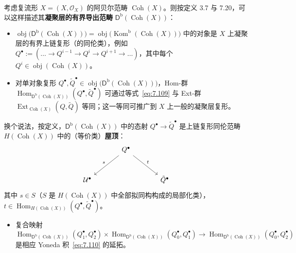 \begin{Def}\label{def:7.22}
考虑复流形 $X=(X,\mathcal O_X)$ 的阿贝尔范畴 $\operatorname{Coh}(X)$。则按定义 3.7 与 7.20，可以这样描述其\textbf{凝聚层的有界导出范畴} $\mathsf D^{\mathrm b}(\operatorname{Coh}(X))$：
\begin{itemize}
  \item $\operatorname{obj}\bigl(\mathsf D^{\mathrm b}(\operatorname{Coh}(X))\bigr)=\operatorname{obj}\bigl(\operatorname{Kom}^{\mathrm b}(\operatorname{Coh}(X))\bigr)$ 中的对象是 $X$ 上凝聚层的有界上链复形（的同伦类），例如 $Q^\bullet:=(\dots\to Q^{i-1}\to Q^i\to Q^{i+1}\to\dots)$，其中每个 $Q^i\in\operatorname{obj}(\operatorname{Coh}(X))$。
  \item 对单对象复形 $Q^\bullet,\tilde Q^\bullet\in\operatorname{obj}\bigl(\mathsf D^{\mathrm b}(\operatorname{Coh}(X))\bigr)$，Hom-群 $\operatorname{Hom}_{\mathsf D^{\mathrm b}(\operatorname{Coh}(X))}(Q^\bullet,\tilde Q^\bullet)$ 可通过等式~\eqref{eq:7.109} 与 Ext-群 $\operatorname{Ext}_{\operatorname{Coh}(X)}(Q,\tilde Q)$ 等同；这一等同可推广到 $X$ 上一般的凝聚层复形。
\end{itemize}
换个说法，按定义，$\mathsf D^{\mathrm b}(\operatorname{Coh}(X))$ 中的态射 $Q^\bullet\to\tilde Q^\bullet$ 是上链复形同伦范畴 $H(\operatorname{Coh}(X))$ 中的（等价类）\textbf{屋顶}：
\begin{equation}\label{eq:7.111}
\begin{tikzcd}[column sep=large, row sep=large]
& Q^\bullet \arrow[dl, "s"'] \arrow[dr, "t"] & \\
\mathcal U^\bullet & & \tilde Q^\bullet
\end{tikzcd}
\end{equation}
其中 $s\in S$（$S$ 是 $H(\operatorname{Coh}(X))$ 中全部拟同构构成的局部化类），$t\in\operatorname{Hom}_{H(\operatorname{Coh}(X))}(Q^\bullet,\tilde Q^\bullet)$。
\begin{itemize}
  \item 复合映射
  \[
  \operatorname{Hom}_{\mathsf D^{\mathrm b}(\operatorname{Coh}(X))}(Q_1^\bullet,Q_2^\bullet)\times\operatorname{Hom}_{\mathsf D^{\mathrm b}(\operatorname{Coh}(X))}(Q_0^\bullet,Q_1^\bullet)\to\operatorname{Hom}_{\mathsf D^{\mathrm b}(\operatorname{Coh}(X))}(Q_0^\bullet,Q_2^\bullet)
  \]
  是相应 Yoneda 积~\eqref{eq:7.110} 的延拓。
\end{itemize}
\end{Def}

